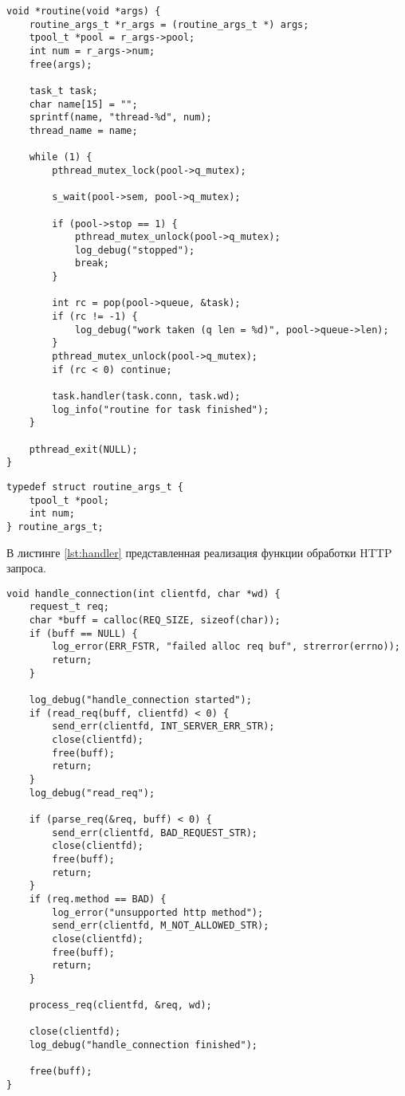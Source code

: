 \begin{center}
\captionsetup{justification=raggedright,singlelinecheck=off}
\begin{lstlisting}[label=lst:routine,caption=Получение задачи из очереди]
void *routine(void *args) {
	routine_args_t *r_args = (routine_args_t *) args;
	tpool_t *pool = r_args->pool;
	int num = r_args->num;
	free(args);
	
	task_t task;
	char name[15] = "";
	sprintf(name, "thread-%d", num);
	thread_name = name;
	
	while (1) {
		pthread_mutex_lock(pool->q_mutex);
		
		s_wait(pool->sem, pool->q_mutex);
		
		if (pool->stop == 1) {
			pthread_mutex_unlock(pool->q_mutex);
			log_debug("stopped");
			break;
		}
		
		int rc = pop(pool->queue, &task);
		if (rc != -1) {
			log_debug("work taken (q len = %d)", pool->queue->len);
		}
		pthread_mutex_unlock(pool->q_mutex);
		if (rc < 0) continue;
		
		task.handler(task.conn, task.wd);
		log_info("routine for task finished");
	}
	
	pthread_exit(NULL);
}
\end{lstlisting}
\end{center}

\begin{center}
\captionsetup{justification=raggedright,singlelinecheck=off}
\begin{lstlisting}[label=lst:task,caption=Получение задачи из очереди]
typedef struct routine_args_t {
	tpool_t *pool;
	int num;
} routine_args_t;
\end{lstlisting}
\end{center}
\FloatBarrier

В листинге \ref{lst:handler} представленная реализация функции обработки HTTP запроса.

\begin{center}
\captionsetup{justification=raggedright,singlelinecheck=off}
\begin{lstlisting}[label=lst:handler,caption=Обработка запроса]
void handle_connection(int clientfd, char *wd) {
	request_t req;
	char *buff = calloc(REQ_SIZE, sizeof(char));
	if (buff == NULL) {
		log_error(ERR_FSTR, "failed alloc req buf", strerror(errno));
		return;
	}
	
	log_debug("handle_connection started");
	if (read_req(buff, clientfd) < 0) {
		send_err(clientfd, INT_SERVER_ERR_STR);
		close(clientfd);
		free(buff);
		return;
	}
	log_debug("read_req");
	
	if (parse_req(&req, buff) < 0) {
		send_err(clientfd, BAD_REQUEST_STR);
		close(clientfd);
		free(buff);
		return;
	}
	if (req.method == BAD) {
		log_error("unsupported http method");
		send_err(clientfd, M_NOT_ALLOWED_STR);
		close(clientfd);
		free(buff);
		return;
	}
	
	process_req(clientfd, &req, wd);
	
	close(clientfd);
	log_debug("handle_connection finished");
	
	free(buff);
}
\end{lstlisting}
\end{center}
